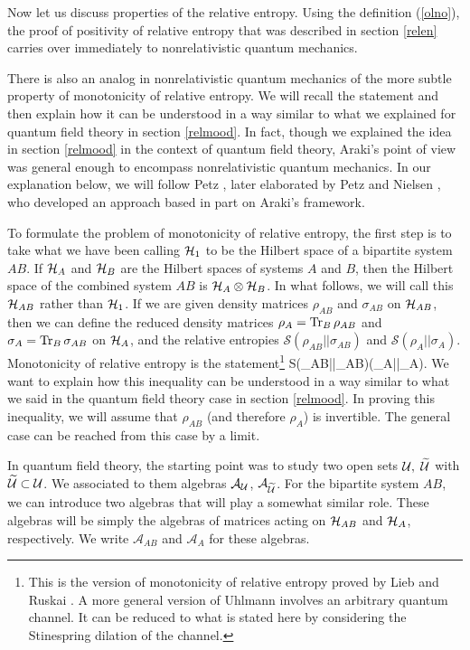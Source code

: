 \documentclass[12pt]{article}
\def\Tr{{\rm Tr}}
\def\S{{\mathcal S}}
\numberwithin{equation}{section}
\def\A{{\mathcal A}}
\begin{document}
Now let us discuss properties of the relative entropy.
Using the definition (\ref{olno}), the proof of positivity of relative entropy that was
described in section \ref{relen} carries over immediately to nonrelativistic quantum mechanics.

There is also an analog in nonrelativistic quantum mechanics of the more subtle property of monotonicity of relative entropy.   We will recall the
statement and then explain  how it can be understood
in a way similar to what we explained for quantum field theory in section \ref{relmood}.   In fact, though we explained the idea in
section \ref{relmood} in the context of quantum field theory, Araki's point of view was general enough to encompass nonrelativistic
quantum mechanics.  In our explanation below, we will follow Petz \cite{Petz}, later elaborated by Petz and Nielsen \cite{PetzNielsen},
who developed an approach  based in part on Araki's framework.  

To formulate the problem of monotonicity of relative entropy, the first step is to take what we have been calling ${\mathcal H}_1$
to be the Hilbert space of a bipartite system $AB$.
If ${\mathcal H}_A$ and ${\mathcal H}_B$ are the Hilbert spaces of systems $A$ and $B$, then the Hilbert space of the combined system $AB$
is ${\mathcal H}_A\otimes {\mathcal H}_B$.  In what follows, we will call this ${\mathcal H}_{AB}$ rather than ${\mathcal H}_1$.     If we are given density matrices $\rho_{AB}$ and $\sigma_{AB}$ on ${\mathcal H}_{AB}$, then we can
define the reduced density matrices $\rho_A=\Tr_B\,\rho_{AB}$ and $\sigma_A=\Tr_B\,\sigma_{AB}$ on ${\mathcal H}_A$, and the relative
entropies   $\S(\rho_{AB}||\sigma_{AB})$ and $\S(\rho_A||\sigma_A)$.   Monotonicity of relative entropy is the statement\footnote{This
is the version of monotonicity of relative entropy proved by Lieb and Ruskai \cite{LiebRuskai}.
A more general version of Uhlmann  \cite{Uhlmann}   involves an arbitrary quantum channel.  It can be reduced
to what is stated here by considering the Stinespring dilation of the channel.}
\be\label{nbcn} \S(\rho_{AB}||\sigma_{AB})\geq \S(\rho_A||\sigma_A). \ee
We want to explain how this inequality can be understood in a way similar to what we said in the quantum field theory case in section
\ref{relmood}.   In proving this inequality, we will assume that $\rho_{AB}$ (and therefore $\rho_A$) is invertible.   The general case
can be reached from this case by a limit.

In quantum field theory, the starting point was to study two open sets ${\mathcal U},$ $\t \U$ with $\t\U\subset \U$.  We associated
to them algebras $\A_\U$, $\A_{\t\U}$.    For the bipartite system $AB$, we can introduce two algebras that will play a somewhat
similar role.  These algebras will be simply the algebras of matrices acting on ${\mathcal H}_{AB}$ and ${\mathcal H}_A$, respectively.  We write 
$\A_{AB}$ and $\A_A$ for these algebras.  
\end{document}
